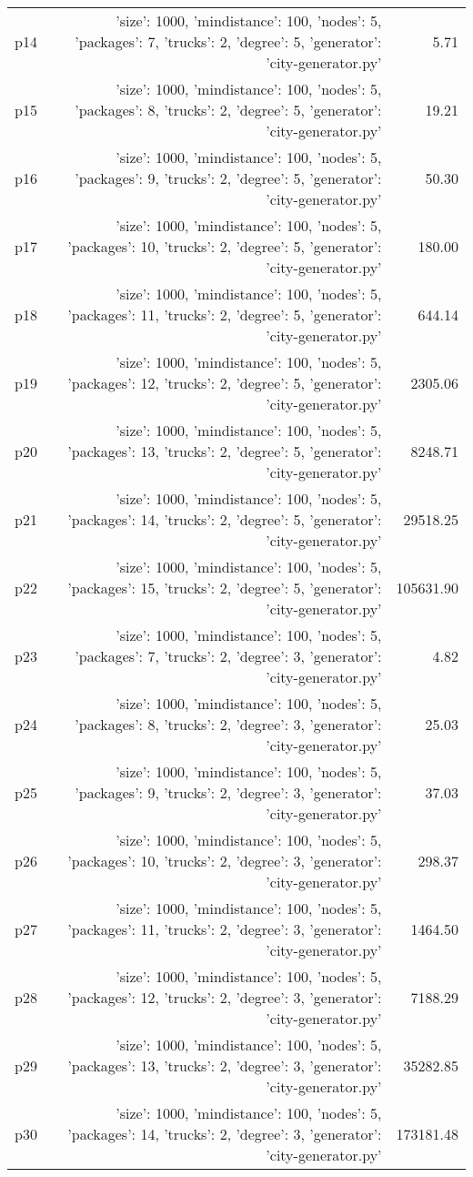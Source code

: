 \documentclass{article}
\begin{document}
\begin{center}
\begin{tabular}{@{}l|r|r@{}}
  p14&{'size': 1000, 'mindistance': 100, 'nodes': 5, 'packages': 7, 'trucks': 2, 'degree': 5, 'generator': 'city-generator.py'}&5.71\\
  p15&{'size': 1000, 'mindistance': 100, 'nodes': 5, 'packages': 8, 'trucks': 2, 'degree': 5, 'generator': 'city-generator.py'}&19.21\\
  p16&{'size': 1000, 'mindistance': 100, 'nodes': 5, 'packages': 9, 'trucks': 2, 'degree': 5, 'generator': 'city-generator.py'}&50.30\\
  p17&{'size': 1000, 'mindistance': 100, 'nodes': 5, 'packages': 10, 'trucks': 2, 'degree': 5, 'generator': 'city-generator.py'}&180.00\\
  p18&{'size': 1000, 'mindistance': 100, 'nodes': 5, 'packages': 11, 'trucks': 2, 'degree': 5, 'generator': 'city-generator.py'}&644.14\\
  p19&{'size': 1000, 'mindistance': 100, 'nodes': 5, 'packages': 12, 'trucks': 2, 'degree': 5, 'generator': 'city-generator.py'}&2305.06\\
  p20&{'size': 1000, 'mindistance': 100, 'nodes': 5, 'packages': 13, 'trucks': 2, 'degree': 5, 'generator': 'city-generator.py'}&8248.71\\
  p21&{'size': 1000, 'mindistance': 100, 'nodes': 5, 'packages': 14, 'trucks': 2, 'degree': 5, 'generator': 'city-generator.py'}&29518.25\\
  p22&{'size': 1000, 'mindistance': 100, 'nodes': 5, 'packages': 15, 'trucks': 2, 'degree': 5, 'generator': 'city-generator.py'}&105631.90\\
  p23&{'size': 1000, 'mindistance': 100, 'nodes': 5, 'packages': 7, 'trucks': 2, 'degree': 3, 'generator': 'city-generator.py'}&4.82\\
  p24&{'size': 1000, 'mindistance': 100, 'nodes': 5, 'packages': 8, 'trucks': 2, 'degree': 3, 'generator': 'city-generator.py'}&25.03\\
  p25&{'size': 1000, 'mindistance': 100, 'nodes': 5, 'packages': 9, 'trucks': 2, 'degree': 3, 'generator': 'city-generator.py'}&37.03\\
  p26&{'size': 1000, 'mindistance': 100, 'nodes': 5, 'packages': 10, 'trucks': 2, 'degree': 3, 'generator': 'city-generator.py'}&298.37\\
  p27&{'size': 1000, 'mindistance': 100, 'nodes': 5, 'packages': 11, 'trucks': 2, 'degree': 3, 'generator': 'city-generator.py'}&1464.50\\
  p28&{'size': 1000, 'mindistance': 100, 'nodes': 5, 'packages': 12, 'trucks': 2, 'degree': 3, 'generator': 'city-generator.py'}&7188.29\\
  p29&{'size': 1000, 'mindistance': 100, 'nodes': 5, 'packages': 13, 'trucks': 2, 'degree': 3, 'generator': 'city-generator.py'}&35282.85\\
  p30&{'size': 1000, 'mindistance': 100, 'nodes': 5, 'packages': 14, 'trucks': 2, 'degree': 3, 'generator': 'city-generator.py'}&173181.48
                            \end{tabular}
                            \end{center}
                    
\end{document}
